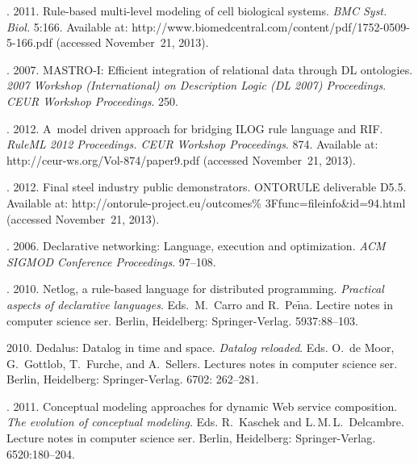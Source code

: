\begin{multicols}{2}
{{\begin{thebibliography}{99}
. 2011. Rule-based multi-level
modeling of cell biological systems. \textit{BMC Syst. Biol.} 5:166. Available at:
{\sf http://www.biomedcentral.com/content/pdf/1752-0509-5-166.pdf} (accessed
November~21, 2013).

. 2007. MASTRO-I: Efficient integration of relational data through DL
ontologies. \textit{2007 Workshop (International) on Description Logic (DL 2007)
Proceedings}. \textit{CEUR Workshop Proceedings}. 250.

. 2012. A~model driven
approach for bridging ILOG rule language and RIF. \textit{RuleML 2012 Proceedings.
CEUR Workshop Proceedings}. 874. Available at: {\sf http://ceur-ws.org/Vol-874/paper9.pdf} (accessed November~21, 2013).

. 2012. Final steel
industry public demonstrators. ONTORULE deliverable D5.5. Available at: {\sf
http://ontorule-project.eu/outcomes\% 3Ffunc=fileinfo\&id=94.html} (accessed
November~21, 2013).

. 2006. Declarative networking: Language,
execution and optimization. \textit{ACM SIGMOD Conference Proceedings}. 97--108.


. 2010. Netlog, a rule-based language for distributed
programming. \textit{Practical aspects of declarative
languages}. Eds.\ M.~Carro and R.~Pe$\tilde{\mbox{n}}$a. Lectire notes
in computer science ser. Berlin, Heidelberg: Springer-Verlag. 5937:88--103.

2010. Dedalus: Datalog in time and space.
\textit{Datalog reloaded}. Eds. O.~de Moor, G.~Gottlob, T.~Furche, and A.~Sellers.
Lectures notes in computer science ser. Berlin, Heidelberg: Springer-Verlag. 6702: 262--281.


. 2011. Conceptual
modeling approaches for dynamic Web service composition. \textit{The evolution of
conceptual modeling}. Eds. R.~Kaschek and L.\,M.\,L.~Delcambre. Lecture notes in computer science ser.
Berlin, Heidelberg: Springer-Verlag. 6520:180--204.


\end{thebibliography}}}
\end{multicols}
